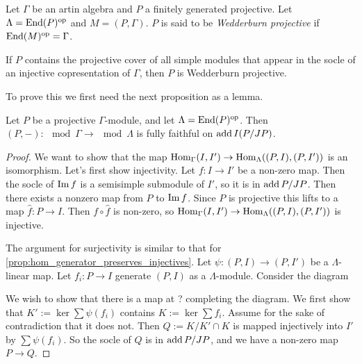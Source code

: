 \begin{defn}
	Let $\Gamma$ be an artin algebra and $P$ a finitely generated projective. Let $\Lambda = \operatorname{End}(P)^{\operatorname{op}}$ and $M=(P, \Gamma)$. $P$ is said to be \emph{Wedderburn projective} if $\operatorname{End}(M)^{\operatorname{op}}=\Gamma$.
\end{defn}

\begin{prop}\label{prop:wedderburn_criterion}
	If $P$ contains the projective cover of all simple modules that appear in the socle of an injective copresentation of $\Gamma$, then $P$ is Wedderburn projective.
\end{prop}

To prove this we first need the next proposition as a lemma.

\begin{prop}
	Let $P$ be a projective $\Gamma$-module, and let $\Lambda = \operatorname{End}(P)^{\operatorname{op}}$. Then $(P, -)\colon\mod \Gamma \to \mod \Lambda$ is fully faithful on $\operatorname{add} I(P/JP)$.
	\begin{proof}
		We want to show that the map $\operatorname{Hom}_\Gamma(I, I') \to \operatorname{Hom}_\Lambda((P,I), (P, I'))$ is an isomorphism. Let's first show injectivity. Let $f\colon I\to I'$ be a non-zero map. Then the socle of $\operatorname{Im} f$ is a semisimple submodule of $I'$, so it is in $\operatorname{add} P/JP$. Then there exists a nonzero map from $P$ to $\operatorname{Im} f$. Since $P$ is projective this lifts to a map $\hat{f}\colon P\to I$. Then $f \circ \hat{f}$ is non-zero, so $\operatorname{Hom}_\Gamma(I, I') \to \operatorname{Hom}_\Lambda((P,I), (P, I'))$ is injective.
		
		The argument for surjectivity is similar to that for \cref{prop:hom_generator_preserves_injectives}. Let $\psi\colon(P,I)\to (P, I')$ be a $\Lambda$-linear map. Let $f_i\colon P\to I$ generate $(P,I)$ as a $\Lambda$-module. Consider the diagram
		\begin{center}
		\end{center}
		We wish to show that there is a map at ? completing the diagram. We first show that $K':=\ker \sum \psi(f_i)$ contains $K:=\ker \sum f_i$. Assume for the sake of contradiction that it does not. Then $Q := K / K' \cap K$ is mapped injectively into $I'$ by $\sum \psi(f_i)$. So the socle of $Q$ is in $\operatorname{add} P/JP$, and we have a non-zero map $P \to Q$.
		

\end{proof}
\end{prop}
